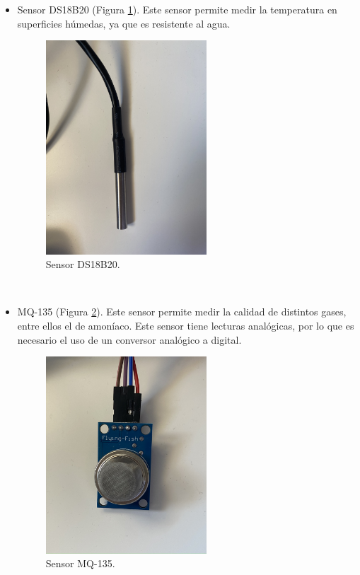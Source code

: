 \begin{itemize}
\item{Sensor DS18B20 (Figura \ref{fig:ds}).} Este sensor permite medir la temperatura en superficies húmedas, ya que es resistente al agua.
\begin{figure} [h!]
  \begin{center}
    \includegraphics[width=6cm]{figs/ds}
  \end{center}
  \caption{Sensor DS18B20.}
  \label{fig:ds}
\end{figure}\\

\item{MQ-135 (Figura \ref{fig:mq}).} Este sensor permite medir la calidad de distintos gases, entre ellos el de amoníaco. Este sensor tiene lecturas analógicas, por lo que es necesario el uso de un conversor analógico a digital.
\begin{figure} [h!]
  \begin{center}
    \includegraphics[width=6cm]{figs/mq}
  \end{center}
  \caption{Sensor MQ-135.}
  \label{fig:mq}
\end{figure}\\


\end{itemize}
